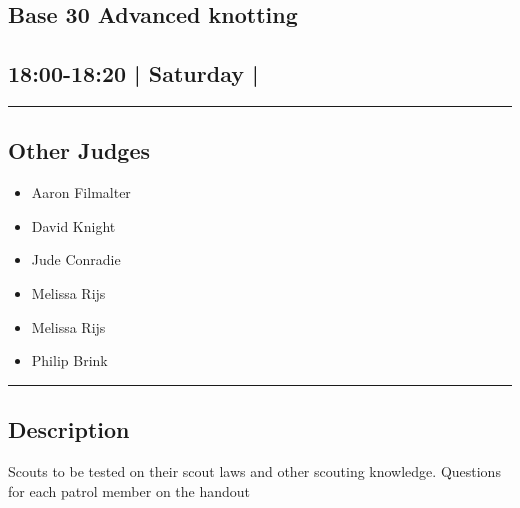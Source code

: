 \documentclass[10pt, A5]{article}
\begin{document}
	

		\begin{framed}
			\begin{minipage}{\textwidth}

			\setcounter{section}{65}
							\section{\faStar \: Base 30 \faStar \: Advanced knotting}
						
			\subsection*{18:00-18:20 | Saturday | }

			\vspace{0.25cm}
			\hrule
			\vspace{0.25cm}


			\subsection*{Other Judges}
							

				\begin{multicols}{2}

			\begin{itemize}
											\item Aaron Filmalter
											\item David Knight
											\item Jude Conradie
											\item Melissa Rijs
								\end{itemize}

			\vfill\null
			\columnbreak

			\begin{itemize}
											\item Melissa Rijs
											\item Philip Brink
								\end{itemize}

			\vfill\null

			\end{multicols}

			\vspace{0.25cm}
			\hrule
			\vspace{0.25cm}

			\begin{minipage}{\textwidth}
			\subsection*{\faListAlt \: Description}
			Scouts to be tested on their scout laws and other scouting knowledge. Questions for each patrol member on the handout
			\end{minipage}


	\end{minipage}
	\end{framed}
\end{document}
